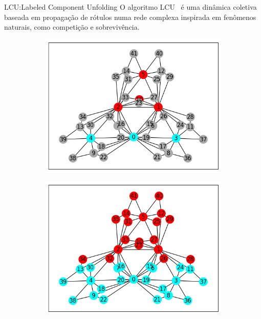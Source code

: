 \documentclass{templatebeamerufc/libs/ufc_format}
\begin{document}
\begin{frame}{LCU:\@ Labeled Component Unfolding}
  O algoritmo LCU~\cite{VerriNetworkUnfoldingMap2018} é uma dinâmica coletiva baseada em
propagação de rótulos numa rede complexa inspirada em fenômenos
naturais, como competição e sobrevivência.

\begin{figure}[!h]
\centering
    \caption{\label{fig:lcu-execution}
      Rede complexa para execução da dinâmica LCU.\@
      Anotação parcial em~() e resultado final em~().
    }

    \begin{subfigure}[b]{0.45\textwidth}
    \centering
    \includegraphics[scale=0.4]{figuras/lcu-partial}
    \caption{\label{fig:lcu-partial}}
    \end{subfigure}
\quad
    \begin{subfigure}[b]{0.45\textwidth}
    \centering
    \includegraphics[scale=0.4]{figuras/lcu-done}
    \caption{\label{fig:lcu-done}}
    \end{subfigure}
    \source{\fonteautor}
\quad
\end{figure}
\end{frame}
\end{document}
